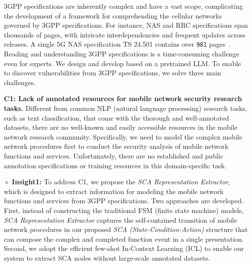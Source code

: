 3GPP specifications are inherently complex and have a vast scope, complicating the development of a framework for comprehending the cellular networks governed by 3GPP specifications. For instance, NAS and RRC specifications span thousands of pages, with intricate interdependencies and frequent updates across releases. A single 5G NAS specification TS 24.501 contains over \texttt{981} pages~\cite{3GPP_TS_24501}. Reading and understanding 3GPP specifications is a time-consuming challenge even for experts. We design and develop \lm based on a pretrained LLM. 
To enable \lm to discover vulnerabilities from 3GPP specifications, we solve three main challenges.  

\noindent \textbf{C1: Lack of annotated resources for mobile network security research tasks.}
Different from common NLP (natural language processing) research tasks, such as text classification, that come with the thorough and well-annotated datasets, there are no well-known and easily accessible resources in the mobile network research community. Specifically, we need to model the complex mobile network procedures first to conduct the security analysis of mobile network functions and services. Unfortunately, there are no established and public annotation specifications or training resources in this domain-specific task. 

\noindent $\diamond$ \textbf{Insight1:} To address C1, we propose the \textit{SCA Representation Extractor}, which is designed to extract information for modeling the mobile network functions and services from 3GPP specifications. Two approaches are developed. First, instead of constructing the traditional FSM (finite state machine) models, \textit{SCA Representation Extractor} captures the self-contained transition of mobile network procedures in our proposed \textit{SCA (State-Condition-Action)} structure that can compose the complex and completed function event in a single presentation. Second, we adopt the efficient few-shot In-Context Learning (ICL) to enable our system to extract SCA nodes without large-scale annotated datasets. 

